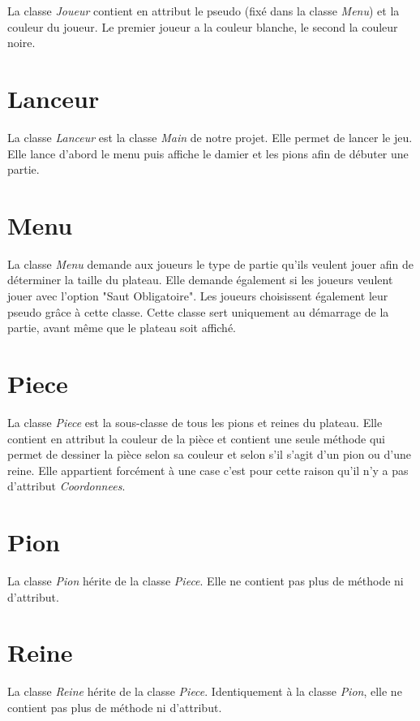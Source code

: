 \documentclass[12,french]{report}
\begin{document}
La classe \textit{Joueur} contient en attribut le pseudo (fixé dans la classe \textit{Menu}) et la couleur du joueur. Le premier joueur a la couleur blanche, le second la couleur noire.

\section{Lanceur}

La classe \textit{Lanceur} est la classe \textit{Main} de notre projet. Elle permet de lancer le jeu. Elle lance d'abord le menu puis affiche le damier et les pions afin de débuter une partie.

\section{Menu}

La classe \textit{Menu} demande aux joueurs le type de partie qu'ils veulent jouer afin de déterminer la taille du plateau. Elle demande également si les joueurs veulent jouer avec l'option "Saut Obligatoire". Les joueurs choisissent également leur pseudo grâce à cette classe. Cette classe sert uniquement au démarrage de la partie, avant même que le plateau soit affiché.

\section{Piece}

La classe \textit{Piece} est la sous-classe de tous les pions et reines du plateau. Elle contient en attribut la couleur de la pièce et contient une seule méthode qui permet de dessiner la pièce selon sa couleur et selon s'il s'agit d'un pion ou d'une reine. Elle appartient forcément à une case c'est pour cette raison qu'il n'y a pas d'attribut \textit{Coordonnees}.

\section{Pion}

La classe \textit{Pion} hérite de la classe \textit{Piece}. Elle ne contient pas plus de méthode ni d'attribut.

\section{Reine}

La classe \textit{Reine} hérite de la classe \textit{Piece}. Identiquement à la classe \textit{Pion}, elle ne contient pas plus de méthode ni d'attribut.
\end{document}
